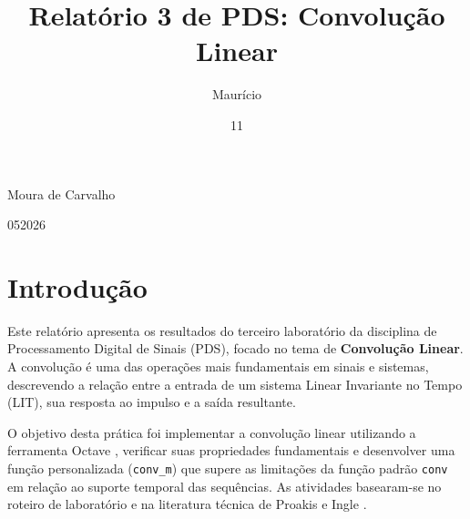 \documentclass[tcc]{classe_uftex/uftex}
\begin{document}
  \title{Relatório 3 de PDS: Convolução Linear}
  \author{Maurício}{Moura de Carvalho}

  
  \date{11}{05}{2026}
  

  
  \maketitle
  \frontmatter

  \tableofcontents 
  
  \mainmatter
  \setcounter{page}{1} 
  \onehalfspacing


\chapter{Introdução}

Este relatório apresenta os resultados do terceiro laboratório da disciplina de Processamento Digital de Sinais (PDS), focado no tema de \textbf{Convolução Linear}. A convolução é uma das operações mais fundamentais em sinais e sistemas, descrevendo a relação entre a entrada de um sistema Linear Invariante no Tempo (LIT), sua resposta ao impulso e a saída resultante.

O objetivo desta prática foi implementar a convolução linear utilizando a ferramenta Octave \cite{octaveman}, verificar suas propriedades fundamentais e desenvolver uma função personalizada (\texttt{conv\_m}) que supere as limitações da função padrão \texttt{conv} em relação ao suporte temporal das sequências. As atividades basearam-se no roteiro de laboratório \cite{roteiro03} e na literatura técnica de Proakis \cite{proakis_manolakis} e Ingle \cite{ingle2017}.
\end{document}
